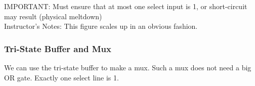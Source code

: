 \begin{frame}[fragile]

IMPORTANT: Must ensure that at most one select input is 1, or
		short-circuit may result (physical meltdown)\\
\BNotes\ifnum{}
Instructor's Notes:
This figure scales up in an obvious fashion.
\fi\ENotes
\end{frame}

\begin{frame}\frametitle{Tri-State Buffer and Mux}

We can use the tri-state buffer to make a mux. Such a mux does not need a big OR gate. Exactly one select line is 1.

\begin{figure}[H]
\centering
\end{figure}


\end{frame}

 



